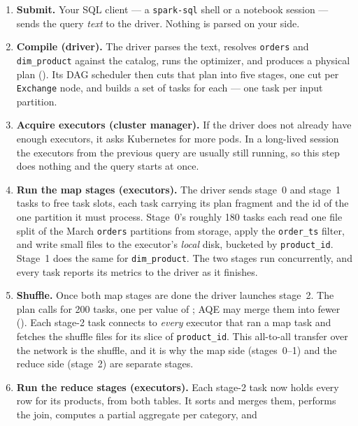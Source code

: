 \begin{enumerate}
  \item \textbf{Submit.} Your SQL client --- a \texttt{spark-sql} shell or a notebook
        session --- sends the query \emph{text} to the driver. Nothing is parsed
        on your side.
  \item \textbf{Compile (driver).} The driver parses the text, resolves
        \texttt{orders} and \texttt{dim\_product} against the catalog, runs the
        optimizer, and produces a physical plan (). Its DAG
        scheduler then cuts that plan into five stages, one cut per
        \texttt{Exchange} node, and builds a set of tasks for each --- one task
        per input partition.
  \item \textbf{Acquire executors (cluster manager).} If the driver does not
        already have enough executors, it asks Kubernetes for more pods. In a
        long-lived session the executors from the previous query are usually
        still running, so this step does nothing and the query starts at once.
  \item \textbf{Run the map stages (executors).} The driver sends stage~0 and
        stage~1 tasks to free task slots, each task carrying its plan fragment
        and the id of the one partition it must process. Stage~0's roughly 180
        tasks each read one file split of the March \texttt{orders} partitions
        from storage, apply the \texttt{order\_ts} filter, and write small files to
        the executor's \emph{local} disk, bucketed by \texttt{product\_id}.
        Stage~1 does the same for \texttt{dim\_product}. The two stages run
        concurrently, and every task reports its metrics to the driver as it
        finishes.
  \item \textbf{Shuffle.} Once both map stages are done the driver launches
        stage~2. The plan calls for 200 tasks, one per value of
        ; AQE may merge them into fewer
        (). Each stage-2 task connects to \emph{every} executor
        that ran a map task and fetches the shuffle files for its slice of
        \texttt{product\_id}. This all-to-all transfer over the network is the
        shuffle, and it is why the map side (stages~0--1) and the reduce side
        (stage~2) are separate stages.
  \item \textbf{Run the reduce stages (executors).} Each stage-2 task now holds
        every row for its products, from both tables. It sorts and merges them,
        performs the join, computes a partial aggregate per category, and

\end{enumerate}
